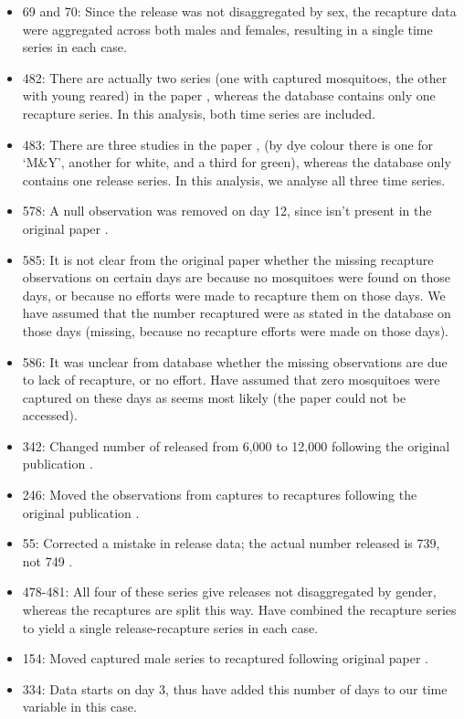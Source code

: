 \documentclass[12pt]{article}
\begin{document}
\begin{itemize}
	\item 69 and 70: Since the release was not disaggregated by sex, the recapture data were aggregated across both males and females, resulting in a single time series in each case.
	\item 482: There are actually two series (one with captured mosquitoes, the other with young reared) in the paper \cite[]{rawlings1981influence}, whereas the database contains only one recapture series. In this analysis, both time series are included.
	\item 483: There are three studies in the paper \cite[]{rawlings1981influence}, (by dye colour there is one for `M\&Y', another for white, and a third for green), whereas the database only contains one release series. In this analysis, we analyse all three time series.
	\item 578: A null observation was removed on day 12, since isn't present in the original paper \cite[]{eyles1943experiment}.
	\item 585: It is not clear from the original paper \cite[]{smith1941observations} whether the missing recapture observations on certain days are because no mosquitoes were found on those days, or because no efforts were made to recapture them on those days. We have assumed that the number recaptured were as stated in the database on those days (missing, because no recapture efforts were made on those days).
	\item 586: It was unclear from database whether the missing observations are due to lack of recapture, or no effort. Have assumed that zero mosquitoes were captured on these days as seems most likely (the paper could not be accessed).
	\item 342: Changed number of released from 6,000 to 12,000 following the original publication \cite[]{bryan1991anopheles}.
	\item 246: Moved the observations from captures to recaptures following the original publication \cite[]{arredondo1998gonotrophic}.
	\item 55: Corrected a mistake in release data; the actual number released is 739, not 749 \cite[]{midega2007estimating}.
	\item 478-481: All four of these series give releases not disaggregated by gender, whereas the recaptures are split this way. Have combined the recapture series to yield a single release-recapture series in each case.
	\item 154: Moved captured male series to recaptured following original paper \cite[]{tsuda2001movement}. 
	\item 334: Data starts on day 3, thus have added this number of days to our time variable in this case.
\end{itemize}
\end{document}
